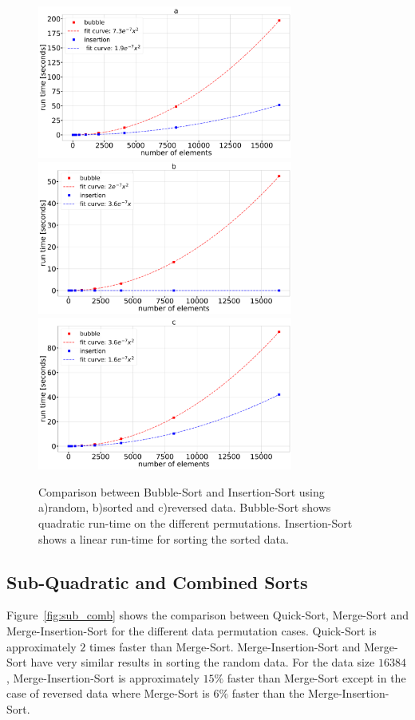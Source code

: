 \documentclass[sigconf, nonacm, natbib, screen, balance=False]{acmart}
\begin{document}
\begin{figure}
  \centering
  \includegraphics[width=84mm]{../figures/bubble_vs_insertion_random.pdf}
  \includegraphics[width=84mm]{../figures/bubble_vs_insertion_sorted.pdf}
  \includegraphics[width=84mm]{../figures/bubble_vs_insertion_reverse.pdf}
  \caption{Comparison between Bubble-Sort and Insertion-Sort using a)random, b)sorted and c)reversed data. Bubble-Sort shows quadratic run-time on the different permutations. Insertion-Sort shows a linear run-time for sorting the sorted data.}
  \label{fig:quad}
\end{figure}


\subsection{Sub-Quadratic and Combined Sorts}
Figure~\ref{fig:sub_comb} shows the comparison between Quick-Sort, Merge-Sort and Merge-Insertion-Sort for the different data permutation cases. Quick-Sort is approximately $2$ times faster than Merge-Sort. Merge-Insertion-Sort and Merge-Sort have very similar results in sorting the random data. For the data size $16384$, Merge-Insertion-Sort is approximately $15 \%$  faster than Merge-Sort except in the case of reversed data where Merge-Sort is $6 \%$ faster than the Merge-Insertion-Sort. 
\end{document}
